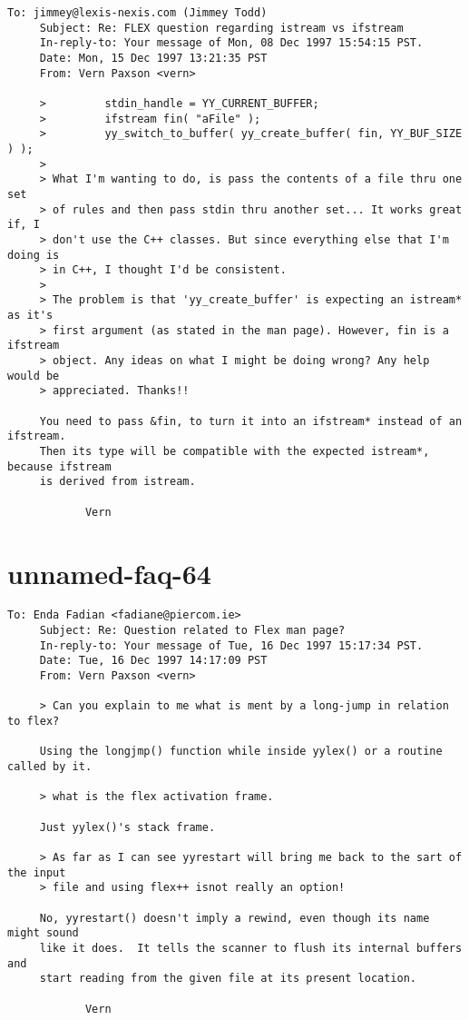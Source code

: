 \documentclass[openany,oneside]{book}
\begin{document}
\begin{verbatim}
To: jimmey@lexis-nexis.com (Jimmey Todd)
     Subject: Re: FLEX question regarding istream vs ifstream
     In-reply-to: Your message of Mon, 08 Dec 1997 15:54:15 PST.
     Date: Mon, 15 Dec 1997 13:21:35 PST
     From: Vern Paxson <vern>
     
     >         stdin_handle = YY_CURRENT_BUFFER;
     >         ifstream fin( "aFile" );
     >         yy_switch_to_buffer( yy_create_buffer( fin, YY_BUF_SIZE ) );
     >
     > What I'm wanting to do, is pass the contents of a file thru one set
     > of rules and then pass stdin thru another set... It works great if, I
     > don't use the C++ classes. But since everything else that I'm doing is
     > in C++, I thought I'd be consistent.
     >
     > The problem is that 'yy_create_buffer' is expecting an istream* as it's
     > first argument (as stated in the man page). However, fin is a ifstream
     > object. Any ideas on what I might be doing wrong? Any help would be
     > appreciated. Thanks!!
     
     You need to pass &fin, to turn it into an ifstream* instead of an ifstream.
     Then its type will be compatible with the expected istream*, because ifstream
     is derived from istream.
     
     		Vern
\end{verbatim}

\section{unnamed-faq-64}

\begin{verbatim}
To: Enda Fadian <fadiane@piercom.ie>
     Subject: Re: Question related to Flex man page?
     In-reply-to: Your message of Tue, 16 Dec 1997 15:17:34 PST.
     Date: Tue, 16 Dec 1997 14:17:09 PST
     From: Vern Paxson <vern>
     
     > Can you explain to me what is ment by a long-jump in relation to flex?
     
     Using the longjmp() function while inside yylex() or a routine called by it.
     
     > what is the flex activation frame.
     
     Just yylex()'s stack frame.
     
     > As far as I can see yyrestart will bring me back to the sart of the input
     > file and using flex++ isnot really an option!
     
     No, yyrestart() doesn't imply a rewind, even though its name might sound
     like it does.  It tells the scanner to flush its internal buffers and
     start reading from the given file at its present location.
     
     		Vern
\end{verbatim}
\end{document}
